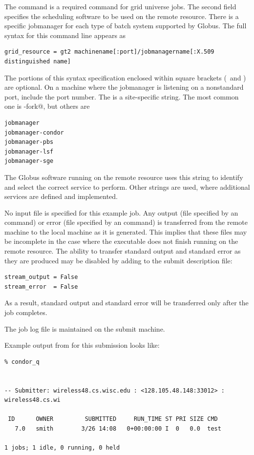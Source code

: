 The command  is a required command
for grid universe jobs.
The second field specifies the scheduling software
to be used on the remote resource.
There is a specific jobmanager for each type of
batch system supported by Globus.
The full syntax for this command line appears as
\footnotesize
\begin{verbatim}
grid_resource = gt2 machinename[:port]/jobmanagername[:X.509 distinguished name]
\end{verbatim}
\normalsize
The portions of this syntax specification enclosed within
square brackets (\Lbr\ and \Rbr) are optional.
On a machine where the jobmanager is listening on a nonstandard port,
include the port number.
The \verb@jobmanagername@ is a site-specific string.
The most common one is \verb@jobmanager-fork@, but others are
\begin{verbatim}
jobmanager
jobmanager-condor
jobmanager-pbs
jobmanager-lsf
jobmanager-sge
\end{verbatim}
The Globus software running on the remote resource
uses this string to identify and select the correct service
to perform.
Other \verb@jobmanagername@ strings are used,
where additional services are defined and implemented.


No input file is specified for this example job.
Any output (file specified by an  command)
or error (file specified by an  command)
is transferred 
from the remote machine to the local machine as it is generated.
This implies that these files may be incomplete in the case
where the executable does not finish running on the remote resource.
The ability to transfer standard output and standard error as
they are produced may be disabled by adding to the submit
description file:
\begin{verbatim}
stream_output = False
stream_error  = False
\end{verbatim}
As a result, standard output and standard error will be transferred
only after the job completes.

The job log file is maintained on the submit machine.

Example output from 
 for this submission looks like:
\footnotesize
\begin{verbatim}
% condor_q


-- Submitter: wireless48.cs.wisc.edu : <128.105.48.148:33012> : wireless48.cs.wi

 ID      OWNER         SUBMITTED     RUN_TIME ST PRI SIZE CMD
   7.0   smith        3/26 14:08   0+00:00:00 I  0   0.0  test

1 jobs; 1 idle, 0 running, 0 held
\end{verbatim}
\normalsize

